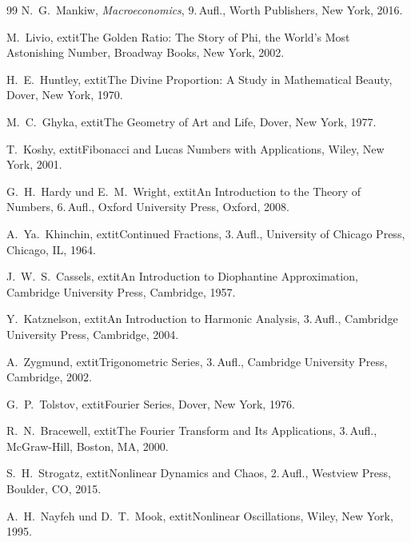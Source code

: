 \documentclass[a4paper, 12pt, twoside, openright]{report}
\theoremstyle{definition}
\theoremstyle{definition}
\begin{document}
\begin{thebibliography}{99}
	N.~G.~Mankiw,
	\textit{Macroeconomics},
	9.\,Aufl., Worth Publishers, New York, 2016.

M.~Livio,
	extit{The Golden Ratio: The Story of Phi, the World's Most Astonishing Number},
Broadway Books, New York, 2002.

H.~E.~Huntley,
	extit{The Divine Proportion: A Study in Mathematical Beauty},
Dover, New York, 1970.

M.~C.~Ghyka,
	extit{The Geometry of Art and Life},
Dover, New York, 1977.

T.~Koshy,
	extit{Fibonacci and Lucas Numbers with Applications},
Wiley, New York, 2001.

G.~H.~Hardy und E.~M.~Wright,
	extit{An Introduction to the Theory of Numbers},
6.\,Aufl., Oxford University Press, Oxford, 2008.

A.~Ya.~Khinchin,
	extit{Continued Fractions},
3.\,Aufl., University of Chicago Press, Chicago, IL, 1964.

J.~W.~S.~Cassels,
	extit{An Introduction to Diophantine Approximation},
Cambridge University Press, Cambridge, 1957.

Y.~Katznelson,
	extit{An Introduction to Harmonic Analysis},
3.\,Aufl., Cambridge University Press, Cambridge, 2004.

A.~Zygmund,
	extit{Trigonometric Series},
3.\,Aufl., Cambridge University Press, Cambridge, 2002.

G.~P.~Tolstov,
	extit{Fourier Series},
Dover, New York, 1976.

R.~N.~Bracewell,
	extit{The Fourier Transform and Its Applications},
3.\,Aufl., McGraw-Hill, Boston, MA, 2000.

S.~H.~Strogatz,
	extit{Nonlinear Dynamics and Chaos},
2.\,Aufl., Westview Press, Boulder, CO, 2015.

A.~H.~Nayfeh und D.~T.~Mook,
	extit{Nonlinear Oscillations},
Wiley, New York, 1995.


\end{thebibliography}
\end{document}
